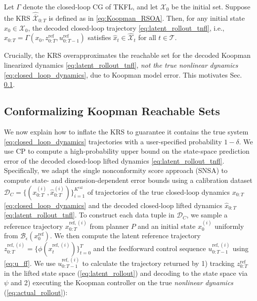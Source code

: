\documentclass{l4dc2026}
\begin{document}
\setcounter{theorem}{0}
\begin{lemma}
\label{lem:koopman_containment}
\renewcommand{\thelemma}{1}
Let $\Gamma$ denote the closed-loop CG of TKFL, and let $\mathcal{X}_0$ be the initial set. Suppose the KRS $\hat{\overline{\mathcal{X}}}_{0:T}$ is defined as in \eqref{eq:Koopman_RSOA}. Then, for any initial state $x_0 \in \mathcal{X}_0$, the decoded closed-loop trajectory \eqref{eq:latent_rollout_tnfl}, i.e.,
$\hat{x}_{0:T} = \Gamma(x_0, z^{\text{ref}}_{0:T}, u^{\text{ref}}_{0:T-1})$ satisfies $\hat{x}_t \in \hat{\mathcal{X}}_t$ for all $t \in \mathcal{T}$.
\end{lemma}

\noindent Crucially, the KRS overapproximates the reachable set for the decoded Koopman linearized dynamics \eqref{eq:latent_rollout_tnfl}, \textit{not the true nonlinear dynamics} \eqref{eq:closed_loop_dynamics}, due to Koopman model error. This motivates Sec. \ref{sec:conformalize_KRS}.

\subsection{Conformalizing Koopman Reachable Sets}
\label{sec:conformalize_KRS}
We now explain how to inflate the KRS to guarantee it contains the true system \eqref{eq:closed_loop_dynamics} trajectories with a user-specified probability $1-\delta$. We use CP to compute a high-probability upper bound on the state-space prediction error of the decoded closed-loop lifted dynamics \eqref{eq:latent_rollout_tnfl}. Specifically, we adapt the single nonconformity score approach (SNSA) \citep{cp_survey} to compute state- and dimension-dependent error bounds using a calibration dataset $\mathcal{D}_C = \{(x_{0:T}^{(i)}, \hat x_{0:T}^{(i)})\}_{i=1}^{K^\textrm{cal}}$ of trajectories of the true closed-loop dynamics $x_{0:T}$ \eqref{eq:closed_loop_dynamics} and the decoded closed-loop lifted dynamics $\hat x_{0:T}$  \eqref{eq:latent_rollout_tnfl}. To construct each data tuple in $\mathcal{D}_C$, we sample a reference trajectory $x_{0:T}^{\text{ref},(i)}$ from planner $P$ and an initial state $x_0^{(i)}$ uniformly from $\mathcal{B}_{\epsilon}(x_{0}^{\text{ref}})$. We then compute the latent reference trajectory $z_{0:T}^{\text{ref}, (i)} = \{\phi(x_{t}^{\text{ref},(i)})\}_{t=0}^T$ and the feedforward control sequence $u_{0:T-1}^{\text{ref}, (i)}$ using \eqref{eq:u_ff}. We use $u_{0:T-1}^{\text{ref}, (i)}$ to calculate the trajectory returned by 1) tracking $z_{0:T}^{\text{ref}}$ in the lifted state space (\ref{eq:latent_rollout}) and decoding to the state space via $\psi$ and 2) executing the Koopman controller on the true \textit{nonlinear dynamics} (\ref{eq:actual_rollout}):
\end{document}
